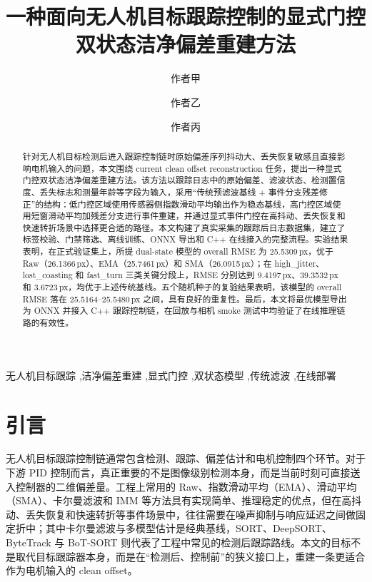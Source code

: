 \documentclass[preprint,12pt]{elsarticle}
\title{一种面向无人机目标跟踪控制的显式门控双状态洁净偏差重建方法}
\author[aff1]{作者甲}
\author[aff1]{作者乙}
\author[aff2]{作者丙\corref{cor1}}
\begin{document}
\begin{frontmatter}

\begin{abstract}
针对无人机目标检测后进入跟踪控制链时原始偏差序列抖动大、丢失恢复敏感且直接影响电机输入的问题，本文围绕 current clean offset reconstruction 任务，提出一种显式门控双状态洁净偏差重建方法。该方法以跟踪日志中的原始偏差、滤波状态、检测置信度、丢失标志和测量年龄等字段为输入，采用“传统预滤波基线 + 事件分支残差修正”的结构：低门控区域使用传感器侧指数滑动平均输出作为稳态基线，高门控区域使用短窗滑动平均加残差分支进行事件重建，并通过显式事件门控在高抖动、丢失恢复和快速转折场景中选择更合适的路径。本文构建了真实采集的跟踪后日志数据集，建立了标签校验、门禁筛选、离线训练、ONNX 导出和 C++ 在线接入的完整流程。实验结果表明，在正式验证集上，所提 dual-state 模型的 overall RMSE 为 25.5309\,px，优于 Raw（26.1366\,px）、EMA（25.7461\,px）和 SMA（26.0915\,px）；在 high\_jitter、lost\_coasting 和 fast\_turn 三类关键分段上，RMSE 分别达到 9.4197\,px、39.3532\,px 和 3.6723\,px，均优于上述传统基线。五个随机种子的复验结果表明，该模型的 overall RMSE 落在 25.5164--25.5480\,px 之间，具有良好的重复性。最后，本文将最优模型导出为 ONNX 并接入 C++ 跟踪控制链，在回放与相机 smoke 测试中均验证了在线推理链路的有效性。
\end{abstract}

\begin{keyword}
无人机目标跟踪 \sep 洁净偏差重建 \sep 显式门控 \sep 双状态模型 \sep 传统滤波 \sep 在线部署
\end{keyword}

\end{frontmatter}

\section{引言}
无人机目标跟踪控制链通常包含检测、跟踪、偏差估计和电机控制四个环节。对于下游 PID 控制而言，真正重要的不是图像级别检测本身，而是当前时刻可直接送入控制器的二维偏差量。工程上常用的 Raw、指数滑动平均（EMA）、滑动平均（SMA）、卡尔曼滤波和 IMM 等方法具有实现简单、推理稳定的优点，但在高抖动、丢失恢复和快速转折等事件场景中，往往需要在噪声抑制与响应延迟之间做固定折中；其中卡尔曼滤波与多模型估计是经典基线，SORT、DeepSORT、ByteTrack 与 BoT-SORT 则代表了工程中常见的检测后跟踪路线\cite{kalman1960new,barshalom2001estimation,bewley2016sort,wojke2017deepsort,zhang2022bytetrack,aharon2022botsort}。本文的目标不是取代目标跟踪器本身，而是在“检测后、控制前”的狭义接口上，重建一条更适合作为电机输入的 clean offset。
\end{document}
